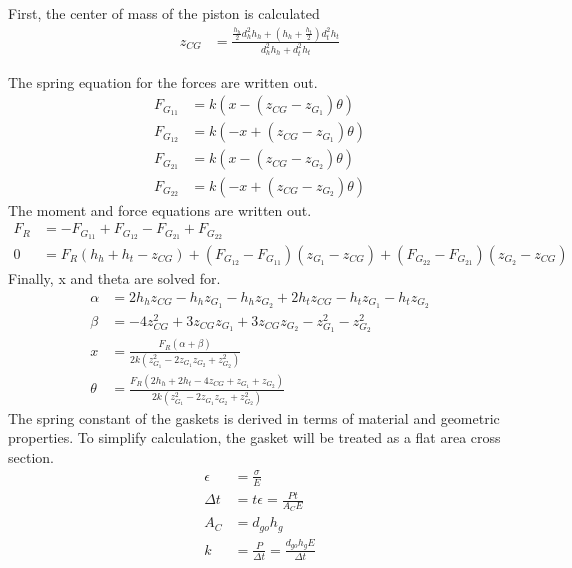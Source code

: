 \documentclass[10pt,a4paper]{article}
\begin{document}
	First, the center of mass of the piston is calculated
	\begin{align}
		z_{CG} &= \frac{\frac{h_h}{2}d_h^2 h_h + (h_h+ \frac{h_t}{2}) d_t^2 h_t}{d_h^2 h_h + d_t^2 h_t }
	\end{align}
	
	The spring equation for the forces are written out.
	\begin{align}
		F_{G_{11}} &= k(x - (z_{CG}-z_{G_1}) \theta) \\
		F_{G_{12}} &= k(-x + (z_{CG}-z_{G_1}) \theta) \\
		F_{G_{21}} &= k(x - (z_{CG}-z_{G_2}) \theta) \\
		F_{G_{22}} &= k(-x + (z_{CG}-z_{G_2}) \theta) 
	\end{align}
	The moment and force equations are written out.
	\begin{align}
		F_R &= - F_{G_{11}} + F_{G_{12}} - F_{G_{21}} + F_{G_{22}}\\
		0 &= F_R (h_h + h_t - z_{CG}) + (F_{G_{12}} - F_{G_{11}})(z_{G_1} - z_{CG})+ (F_{G_{22}} - F_{G_{21}})(z_{G_2} - z_{CG})
	\end{align}
	Finally, x and theta are solved for.
	\begin{align}
	\alpha &= 2 h_{h} z_{CG} - h_{h} z_{G_1} - h_{h} z_{G_2} + 2 h_{t} z_{CG} - h_{t} z_{G_1} - h_{t} z_{G_2}\\
	\beta &= - 4 z_{CG}^{2} + 3 z_{CG} z_{G_1} + 3 z_{CG} z_{G_2} - z_{G_1}^{2} - z_{G_2}^{2}\\
		x &= \frac{F_{R} \left(\alpha +\beta\right)}{2 k \left(z_{G_1}^{2} - 2 z_{G_1} z_{G_2} + z_{G_2}^{2}\right)}\\
		\theta &= \frac{F_{R} \left(2 h_{h} + 2 h_{t} - 4 z_{CG} + z_{G_1} + z_{G_2}\right)}{2 k \left(z_{G_1}^{2} - 2 z_{G_1} z_{G_2} + z_{G_2}^{2}\right)}
	\end{align}
	The spring constant of the gaskets is derived in terms of material and geometric properties. To simplify calculation, the gasket will be treated as a flat area cross section.
	\begin{align}
		\epsilon &= \frac{\sigma}{E}\\
		\Delta t &= t \epsilon = \frac{Pt}{A_C E} \\
		A_C &= d_{go} h_g \\
		k &= \frac{P}{\Delta t} = \frac{d_{go} h_g E}{\Delta t}
	\end{align}
\end{document}
